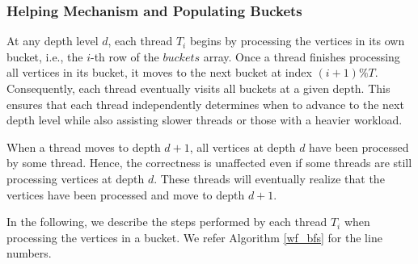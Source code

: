 \subsubsection{Helping Mechanism and Populating Buckets}

At any depth level $d$, each thread $T_i$ begins by processing the vertices in its own bucket, i.e., the $i$-th row of the $buckets$ array. Once a thread finishes processing all vertices in its bucket, it moves to the next bucket at index $(i+1) \% T$. Consequently, each thread eventually visits all buckets at a given depth. This ensures that each thread independently determines when to advance to the next depth level while also assisting slower threads or those with a heavier workload. 

When a thread moves to depth $d+1$, all vertices at depth $d$ have been processed by some thread. Hence, the correctness is unaffected even if some threads are still processing vertices at depth $d$. These threads will eventually realize that the vertices have been processed and move to depth $d+1$.

In the following, we describe the steps performed by each thread $T_i$ when processing the vertices in a bucket. We refer Algorithm \ref{wf_bfs} for the line numbers.

